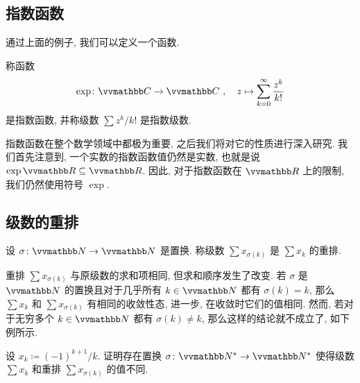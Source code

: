 \subsection{指数函数}

通过上面的例子, 我们可以定义一个函数.

\begin{definition}[指数函数]
    称函数
    \[
        \exp \colon \C \to \C\ ,\quad z \mapsto \sum_{k = 0}^\infty \frac{z^k}{k!}
    \]
    是指数函数, 并称级数 \(\sum z^k / k!\) 是指数级数.
\end{definition}

指数函数在整个数学领域中都极为重要, 之后我们将对它的性质进行深入研究. 我们首先注意到, 一个实数的指数函数值仍然是实数, 也就是说 \(\exp \R \subseteq \R\). 因此, 对于指数函数在 \(\R\) 上的限制, 我们仍然使用符号 \(\exp\).

\subsection{级数的重排}

\begin{definition}[重排]
    设 \(\sigma \colon \N \to \N\) 是置换. 称级数 \(\sum x_{\sigma(k)}\) 是 \(\sum x_k\) 的重排.
\end{definition}

重排 \(\sum x_{\sigma(k)}\) 与原级数的求和项相同, 但求和顺序发生了改变. 若 \(\sigma\) 是 \(\N\) 的置换且对于几乎所有 \(k \in \N\) 都有 \(\sigma(k) = k\), 那么 \(\sum x_k\) 和 \(\sum x_{\sigma(k)}\) 有相同的收敛性态, 进一步, 在收敛时它们的值相同. 然而, 若对于无穷多个 \(k \in \N\) 都有 \(\sigma(k) \neq k\), 那么这样的结论就不成立了, 如下例所示.

\begin{example}
    设 \(x_k \coloneqq (- 1)^{k + 1} / k\). 证明存在置换 \(\sigma \colon \N^\ast \to \N^\ast\) 使得级数 \(\sum x_k\) 和重排 \(\sum x_{\sigma(k)}\) 的值不同.
\end{example}

